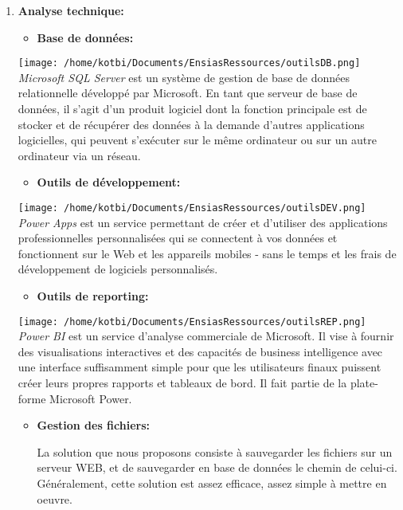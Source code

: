 \documentclass[
]{article}
\begin{document}
\begin{enumerate}
\def\labelenumi{\arabic{enumi}.}
\item
  \textbf{Analyse technique:}

  \begin{itemize}
  \item
    \textbf{Base de données:}
  \end{itemize}

  \texttt{[image: /home/kotbi/Documents/EnsiasRessources/outilsDB.png]}\\
  \emph{Microsoft SQL Server} est un système de gestion de base de
  données relationnelle développé par Microsoft. En tant que serveur de
  base de données, il s'agit d'un produit logiciel dont la fonction
  principale est de stocker et de récupérer des données à la demande
  d'autres applications logicielles, qui peuvent s'exécuter sur le même
  ordinateur ou sur un autre ordinateur via un réseau.

  \begin{itemize}
  \item
    \textbf{Outils de développement:}
  \end{itemize}

  \texttt{[image: /home/kotbi/Documents/EnsiasRessources/outilsDEV.png]}
  \\
  \emph{Power Apps} est un service permettant de créer et d'utiliser des
  applications professionnelles personnalisées qui se connectent à vos
  données et fonctionnent sur le Web et les appareils mobiles - sans le
  temps et les frais de développement de logiciels personnalisés.

  \begin{itemize}
  \item
    \textbf{Outils de reporting:}
  \end{itemize}

  \texttt{[image: /home/kotbi/Documents/EnsiasRessources/outilsREP.png]}
  \\
  \emph{Power BI} est un service d'analyse commerciale de Microsoft. Il
  vise à fournir des visualisations interactives et des capacités de
  business intelligence avec une interface suffisamment simple pour que
  les utilisateurs finaux puissent créer leurs propres rapports et
  tableaux de bord. Il fait partie de la plate-forme Microsoft Power.

  \begin{itemize}
  \item
    \textbf{Gestion des fichiers:}

    La solution que nous proposons consiste à sauvegarder les fichiers
    sur un serveur WEB, et de sauvegarder en base de données le chemin
    de celui-ci. Généralement, cette solution est assez efficace, assez
    simple à mettre en oeuvre.
  \end{itemize}
\end{enumerate}
\end{document}
